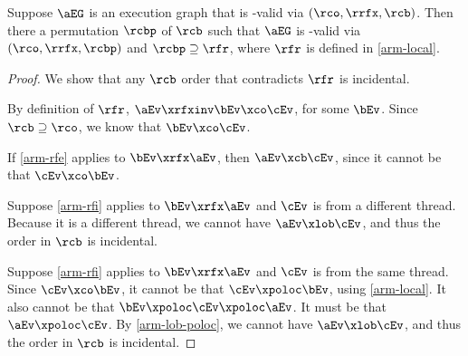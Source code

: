 \begin{lemma}
  \label{lemma:fr}
  Suppose $\aEG$ is an execution graph that is \EC-valid via
  $({\rco}, {\rrfx}, {\rcb})$.  Then there a permutation ${\rcbp}$ of
  ${\rcb}$ such that $\aEG$ is \EC-valid via $({\rco}, {\rrfx}, {\rcbp})$ and
  ${\rcbp}\supseteq{\rfr}$, where ${\rfr}$ is defined in \ref{arm-local}.

  \vspace{-.5\baselineskip}
  \begin{proof}
    We show that any ${\rcb}$ order that contradicts ${\rfr}$ is incidental.

    By definition of $\rfr$, %
    $\aEv\xrfxinv\bEv\xco\cEv$, for some $\bEv$.
    Since ${\rcb}\supseteq{\rco}$, we know that $\bEv\xco\cEv$.

    If \ref{arm-rfe} applies to $\bEv\xrfx\aEv$, then $\aEv\xcb\cEv$, since
    it cannot be that $\cEv\xco\bEv$.

    Suppose \ref{arm-rfi} applies to $\bEv\xrfx\aEv$ and $\cEv$ is from a
    different thread.  Because it is a different thread, we cannot have
    $\aEv\xlob\cEv$, and thus the order in $\rcb$ is incidental.

    Suppose \ref{arm-rfi} applies to $\bEv\xrfx\aEv$ and $\cEv$ is from the
    same thread.  Since $\cEv\xco\bEv$, it cannot be that $\cEv\xpoloc\bEv$,
    using \ref{arm-local}.  It also cannot be that
    $\bEv\xpoloc\cEv\xpoloc\aEv$.  It must be that $\aEv\xpoloc\cEv$.  By
    \ref{arm-lob-poloc}, we cannot have $\aEv\xlob\cEv$, and thus the order
    in $\rcb$ is incidental.
  \end{proof}
\end{lemma}

